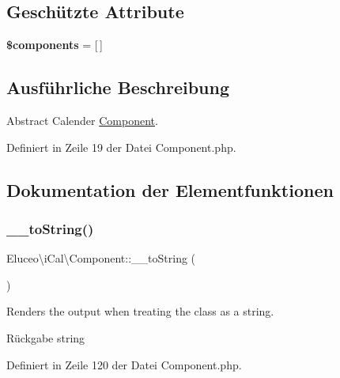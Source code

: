 \subsection*{Geschützte Attribute}
\begin{DoxyCompactItemize}
\item 
\mbox{\label{class_eluceo_1_1i_cal_1_1_component_a84997736ba36065e9451d9760c5b127e}} 
{\bfseries \$components} = \mbox{[}$\,$\mbox{]}
\end{DoxyCompactItemize}


\subsection{Ausführliche Beschreibung}
Abstract Calender \mbox{\hyperlink{class_eluceo_1_1i_cal_1_1_component}{Component}}. 

Definiert in Zeile 19 der Datei Component.\+php.



\subsection{Dokumentation der Elementfunktionen}
\mbox{\label{class_eluceo_1_1i_cal_1_1_component_a34a07b7c39eedd49d4ef421b2d1dddd9}} 
\subsubsection{\texorpdfstring{\+\_\+\+\_\+to\+String()}{\_\_toString()}\hspace{0.1cm}{\footnotesize\ttfamily [1/3]}}
{\footnotesize\ttfamily Eluceo\textbackslash{}i\+Cal\textbackslash{}\+Component\+::\+\_\+\+\_\+to\+String (\begin{DoxyParamCaption}{ }\end{DoxyParamCaption})}

Renders the output when treating the class as a string.

\begin{DoxyReturn}{Rückgabe}
string 
\end{DoxyReturn}


Definiert in Zeile 120 der Datei Component.\+php.

